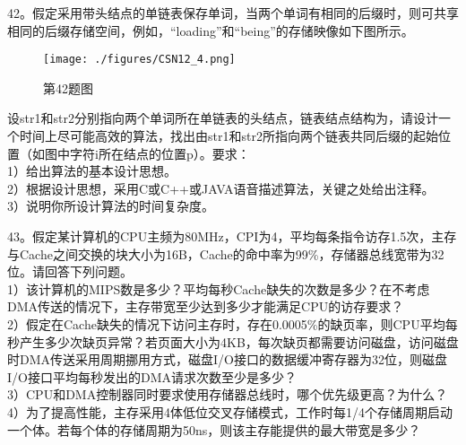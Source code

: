42。假定采用带头结点的单链表保存单词，当两个单词有相同的后缀时，则可共享相同的后缀存储空间，例如，“loading”和“being”的存储映像如下图所示。\\
\begin{figure}[ht]
\centering
\texttt{[image: ./figures/CSN12\_4.png]}
\caption{第42题图} \label{CSN12_fig4}
\end{figure}
设str1和str2分别指向两个单词所在单链表的头结点，链表结点结构为，请设计一个时间上尽可能高效的算法，找出由str1和str2所指向两个链表共同后缀的起始位置（如图中字符i所在结点的位置p）。要求：\\
1）给出算法的基本设计思想。\\
2）根据设计思想，采用C或C++或JAVA语音描述算法，关键之处给出注释。\\
3）说明你所设计算法的时间复杂度。

43。假定某计算机的CPU主频为80MHz，CPI为4，平均每条指令访存1.5次，主存与Cache之间交换的块大小为16B，Cache的命中率为99\%，存储器总线宽带为32位。请回答下列问题。\\
1）该计算机的MIPS数是多少？平均每秒Cache缺失的次数是多少？在不考虑DMA传送的情况下，主存带宽至少达到多少才能满足CPU的访存要求？\\
2）假定在Cache缺失的情况下访问主存时，存在0.0005\%的缺页率，则CPU平均每秒产生多少次缺页异常？若页面大小为4KB，每次缺页都需要访问磁盘，访问磁盘时DMA传送采用周期挪用方式，磁盘I/O接口的数据缓冲寄存器为32位，则磁盘I/O接口平均每秒发出的DMA请求次数至少是多少？\\
3）CPU和DMA控制器同时要求使用存储器总线时，哪个优先级更高？为什么？\\
4）为了提高性能，主存采用4体低位交叉存储模式，工作时每1/4个存储周期启动一个体。若每个体的存储周期为50ns，则该主存能提供的最大带宽是多少？

